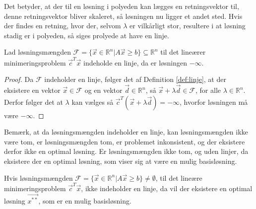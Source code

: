 Det betyder, at der til en løsning i polyeden kan lægges en retningsvektor til, denne retningsvektor bliver skaleret, så løsningen nu ligger et andet sted. Hvis der findes en retning, hvor der, selvom $\lambda$ er vilkårligt stor, resultere i at løsning stadig er i polyeden, så siges prolyede at have en linje.
\begin{prop}
Lad løsningsmængden $\mathcal{F} = \{ \vec{x} \in \mathds{R}^n| A \vec{x} \geq b \} \subseteq \mathds{R}^n $  til det lineærer minimeringsproblem $\vec{c}^T\vec{x}$ indeholde en linje, da er løsningen $-\infty$.
\end{prop}
\begin{proof}
Da $\mathcal{F}$ indeholder en linje, følger det af Definition \ref{def:linje}, at der eksistere en vektor $\vec{x} \in \mathcal{F}$ og en vektor $\vec{d} \in \mathds{R}^n$, så $\vec{x}+\lambda \vec{d} \in \mathcal{F}$, for alle $\lambda \in \mathds{R}^n$. 
Derfor følger det at $\lambda$ kan vælges så $\vec{c}^T(\vec{x}+\lambda\vec{d}) = - \infty$, hvorfor løsningen må være $-\infty$.
\end{proof}
Bemærk, at da løsningsmængden indeholder en linje, kan løsningsmængden ikke være tom, er løsningsmængden tom, er problemet inkonsistent, og der eksistere derfor ikke en optimal løsning. 
Er løsningsmængden ikke tom, og uden linjer, da eksistere der en optimal løsning, som viser sig at være en mulig basisløsning.
\begin{stn}
Hvis løsningsmængden $\mathcal{F} =\{\vec{x} \in \mathds{R}^n| A \vec{x} \geq b \} \neq \emptyset$, til det lineære minimeringsproblem $\vec{c}^T\vec{x}$, ikke indeholder en linje, da vil der eksistere en optimal løsning $\vec{x^{**}}$, som er en mulig basisløsning.
\label{stn:eksistens}
\end{stn}
